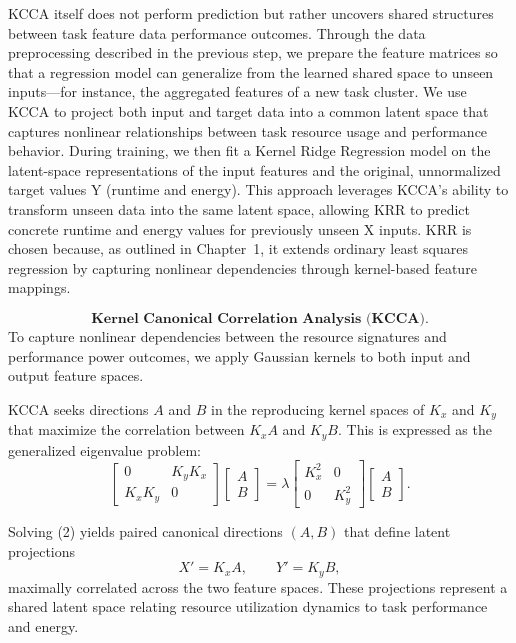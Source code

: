 KCCA itself does not perform prediction but rather uncovers shared structures between task feature data performance outcomes. Through the data preprocessing described in the previous step, we prepare the feature matrices so that a regression model can generalize from the learned shared space to unseen inputs—for instance, the aggregated features of a new task cluster. We use KCCA to project both input and target data into a common latent space that captures nonlinear relationships between task resource usage and performance behavior. During training, we then fit a Kernel Ridge Regression model on the latent-space representations of the input features and the original, unnormalized target values Y (runtime and energy). This approach leverages KCCA's ability to transform unseen data into the same latent space, allowing KRR to predict concrete runtime and energy values for previously unseen X inputs. KRR is chosen because, as outlined in Chapter~1, it extends ordinary least squares regression by capturing nonlinear dependencies through kernel-based feature mappings.

\[
    \textbf{Kernel Canonical Correlation Analysis (KCCA).}
\]
To capture nonlinear dependencies between the resource signatures
and performance power outcomes, we apply Gaussian kernels to both
input and output feature spaces.

KCCA seeks directions \(A\) and \(B\) in the
reproducing kernel spaces of \(K_x\) and \(K_y\)
that maximize the correlation between
\( K_x A \) and \( K_y B \).
This is expressed as the generalized eigenvalue problem:
\[
    \begin{bmatrix}
        0       & K_y K_x \\
        K_x K_y & 0
    \end{bmatrix}
    \begin{bmatrix}
        A \\ B
    \end{bmatrix}
    =
    \lambda
    \begin{bmatrix}
        K_x^2 & 0     \\
        0     & K_y^2
    \end{bmatrix}
    \begin{bmatrix}
        A \\ B
    \end{bmatrix}.
    \tag{2}
\]

Solving (2) yields paired canonical directions
\( (A, B) \) that define latent projections
\[
    X' = K_x A, \qquad Y' = K_y B,
\]
maximally correlated across the two feature spaces.
These projections represent a shared latent space
relating resource utilization dynamics to task performance and energy.

